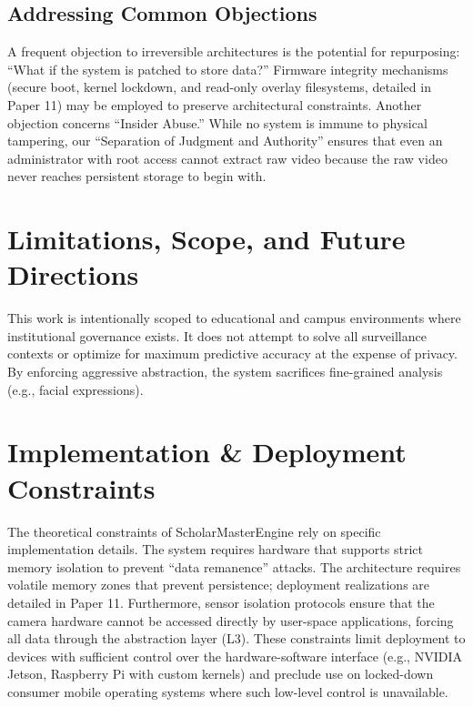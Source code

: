 \documentclass[conference]{IEEEtran}
\begin{document}
\subsection{Addressing Common Objections}
A frequent objection to irreversible architectures is the potential for repurposing: ``What if the system is patched to store data?'' Firmware integrity mechanisms (secure boot, kernel lockdown, and read-only overlay filesystems, detailed in Paper 11) may be employed to preserve architectural constraints. Another objection concerns ``Insider Abuse.'' While no system is immune to physical tampering, our ``Separation of Judgment and Authority'' ensures that even an administrator with root access cannot extract raw video because the raw video never reaches persistent storage to begin with.

\section{Limitations, Scope, and Future Directions}
This work is intentionally scoped to educational and campus environments where institutional governance exists. It does not attempt to solve all surveillance contexts or optimize for maximum predictive accuracy at the expense of privacy. By enforcing aggressive abstraction, the system sacrifices fine-grained analysis (e.g., facial expressions).

\section{Implementation \& Deployment Constraints}
The theoretical constraints of ScholarMasterEngine rely on specific implementation details. The system requires hardware that supports strict memory isolation to prevent ``data remanence'' attacks. The architecture requires volatile memory zones that prevent persistence; deployment realizations are detailed in Paper 11. Furthermore, sensor isolation protocols ensure that the camera hardware cannot be accessed directly by user-space applications, forcing all data through the abstraction layer (L3). These constraints limit deployment to devices with sufficient control over the hardware-software interface (e.g., NVIDIA Jetson, Raspberry Pi with custom kernels) and preclude use on locked-down consumer mobile operating systems where such low-level control is unavailable.
\end{document}
